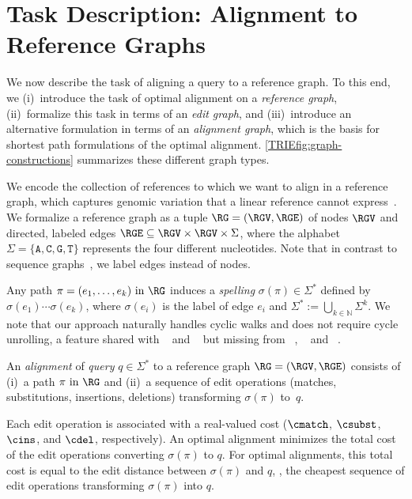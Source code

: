 \section{Task Description: Alignment to Reference Graphs} \label{TRIEsec:task}

We now describe the task of aligning a query to a reference graph. To this end,
we (i)~introduce the task of optimal alignment on a \emph{reference graph},
(ii)~formalize this task in terms of an \emph{edit graph}, and (iii)~introduce an
alternative formulation in terms of an \emph{alignment graph}, which is the
basis for shortest path formulations of the optimal alignment.
%
\cref{TRIEfig:graph-constructions} summarizes these different graph types.

We encode the collection of references to which we want to align in a reference
graph, which captures genomic variation that a linear reference cannot
express~\cite{paten_genome_2017,garrison_variation_2018}.
%
We formalize a reference graph as a tuple $\RG=(\RGV,\RGE)$ of nodes $\RGV$ and
directed, labeled edges $\RGE \subseteq \RGV \times \RGV \times \Sigma$, where
the alphabet $\Sigma=\{\texttt{A},\texttt{C},\texttt{G},\texttt{T}\}$ represents
the four different nucleotides.
%
Note that in contrast to sequence graphs~\cite{rautiainen_aligning_2017}, we
label edges instead of nodes.

Any path $\pi=(e_1,\dots,e_k) \text { in } \RG$ induces a \emph{spelling}
$\sigma(\pi) \in \Sigma^*$ defined by $\sigma(e_1)\cdots\sigma(e_k)$, where
$\sigma(e_i)$ is the label of edge $e_i$ and $\Sigma^* := \bigcup_{k \in
\mathbb{N}} \Sigma^k$. We note that our approach naturally handles cyclic walks
and does not require cycle unrolling, a feature shared with
\bitparallel~\cite{rautiainen_bitparallel_2019} and
\brownie~\cite{heydari_browniealigner_2018} but missing from
\vg~\cite{garrison_variation_2018}, \pasgal~\cite{jain_accelerating_2019} and
\valigntool~\cite{kavya_sequence_2019}.

An \emph{alignment} of \emph{query} $q \in \Sigma^*$ to a reference graph
$\RG=(\RGV,\RGE)$ consists of (i)~a path $\pi \text{ in } \RG$ and (ii)~a
sequence of edit operations (matches, substitutions, insertions, deletions)
transforming $\sigma(\pi)$ to~$q$.

Each edit operation is associated with a real-valued cost ($\cmatch$, $\csubst$,
$\cins$, and $\cdel$, respectively).
An optimal alignment minimizes the total cost of the edit operations converting
$\sigma(\pi)$ to $q$. For optimal alignments, this total cost is equal to the
edit distance between $\sigma(\pi)$ and $q$, \ie, the cheapest sequence of edit
operations transforming $\sigma(\pi)$ into $q$.


